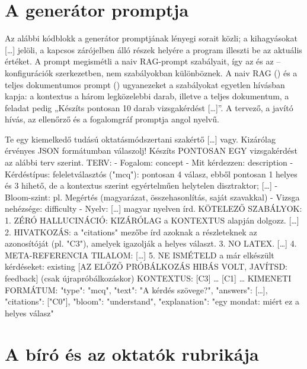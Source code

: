
\chapter{A generátor promptja}
\label{app-prompt}

\begin{sloppypar}
Az alábbi kódblokk a generátor promptjának lényegi sorait közli; a kihagyásokat […] jelöli, a kapcsos
zárójelben álló részek helyére a program illeszti be az aktuális értéket. A prompt megismétli a naiv
RAG-prompt szabályait, így az  és az -- konfigurációk szerkezetben, nem szabályokban
különböznek. A naiv RAG () és a teljes dokumentumos prompt () ugyanezeket a szabályokat
egyetlen hívásban kapja: a kontextus a három legközelebbi darab, illetve a teljes dokumentum, a feladat pedig
„Készíts pontosan 10 darab vizsgakérdést […]”. A tervező, a javító hívás, az ellenőrző és a fogalomgráf
promptja angol nyelvű.
\end{sloppypar}

\begin{kodblokk}
[generator] Te egy kiemelkedő tudású oktatásmódszertani szakértő […] vagy. Kizárólag érvényes JSON
formátumban válaszolj! Készíts PONTOSAN EGY vizsgakérdést az alábbi terv szerint.
TERV: - Fogalom: {concept}   - Mit kérdezzen: {description}
- Kérdéstípus: feleletválasztós ("mcq"): pontosan 4 válasz, ebből pontosan 1 helyes és 3 hihető,
  de a kontextus szerint egyértelműen helytelen disztraktor; […]
- Bloom-szint: {pl. Megértés (magyarázat, összehasonlítás, saját szavakkal)}
- Vizsga nehézsége: {difficulty}   - Nyelv: […] {magyar} nyelven írd.
KÖTELEZŐ SZABÁLYOK:
1. ZÉRÓ HALLUCINÁCIÓ: KIZÁRÓLAG a KONTEXTUS alapján dolgozz. […]
2. HIVATKOZÁS: a "citations" mezőbe írd azoknak a részleteknek az azonosítóját (pl. "C3"),
   amelyek igazolják a helyes választ.
3. NO LATEX. […]  4. META-REFERENCIA TILALOM: […]  5. NE ISMÉTELD a már elkészült kérdéseket: {existing}
[AZ ELŐZŐ PRÓBÁLKOZÁS HIBÁS VOLT, JAVÍTSD: {feedback}]             (csak újrapróbálkozáskor)
KONTEXTUS: [C3] … [C1] …
KIMENETI FORMÁTUM: {"type": "mcq", "text": "A kérdés szövege?", "answers": […], "citations": ["C0"],
 "bloom": "understand", "explanation": "egy mondat: miért ez a helyes válasz"}
\end{kodblokk}

\chapter{A bíró és az oktatók rubrikája}
\label{app-rubrika}

